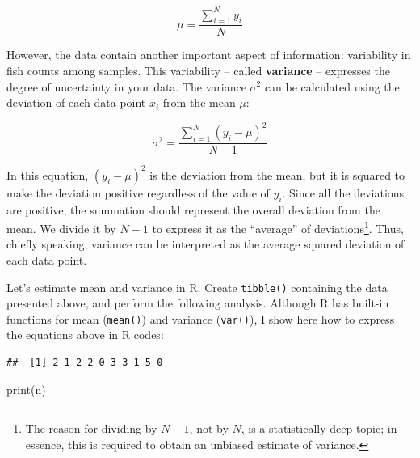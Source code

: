 \documentclass[
]{book}
\newenvironment{Shaded}{\begin{snugshade}}{\end{snugshade}}
\newcommand{\CommentTok}[1]{\textcolor[rgb]{0.56,0.35,0.01}{\textit{#1}}}
\newcommand{\FunctionTok}[1]{\textcolor[rgb]{0.00,0.00,0.00}{#1}}
\newcommand{\NormalTok}[1]{#1}
\newcommand{\OtherTok}[1]{\textcolor[rgb]{0.56,0.35,0.01}{#1}}
\newcommand{\SpecialCharTok}[1]{\textcolor[rgb]{0.00,0.00,0.00}{#1}}
\begin{document}
\[
\mu = \frac{\sum_{i=1}^N y_i}{N}
\]

However, the data contain another important aspect of information: variability in fish counts among samples. This variability -- called \textbf{variance} -- expresses the degree of uncertainty in your data. The variance \(\sigma^2\) can be calculated using the deviation of each data point \(x_i\) from the mean \(\mu\):

\[
\sigma^2 = \frac{\sum_{i=1}^N (y_i - \mu)^2}{N - 1}
\]

In this equation, \((y_i - \mu)^2\) is the deviation from the mean, but it is squared to make the deviation positive regardless of the value of \(y_i\). Since all the deviations are positive, the summation should represent the overall deviation from the mean. We divide it by \(N-1\) to express it as the ``average'' of deviations\footnote{The reason for dividing by \(N-1\), not by \(N\), is a statistically deep topic; in essence, this is required to obtain an unbiased estimate of variance.}. Thus, chiefly speaking, variance can be interpreted as the average squared deviation of each data point.

Let's estimate mean and variance in R. Create \texttt{tibble()} containing the data presented above, and perform the following analysis. Although R has built-in functions for mean (\texttt{mean()}) and variance (\texttt{var()}), I show here how to express the equations above in R codes:

\begin{Shaded}
\end{Shaded}

\begin{verbatim}
##  [1] 2 1 2 2 0 3 3 1 5 0
\end{verbatim}

\begin{Shaded}
\begin{Highlighting}[]
\FunctionTok{print}\NormalTok{(n)}
\end{Highlighting}
\end{Shaded}
\end{document}
